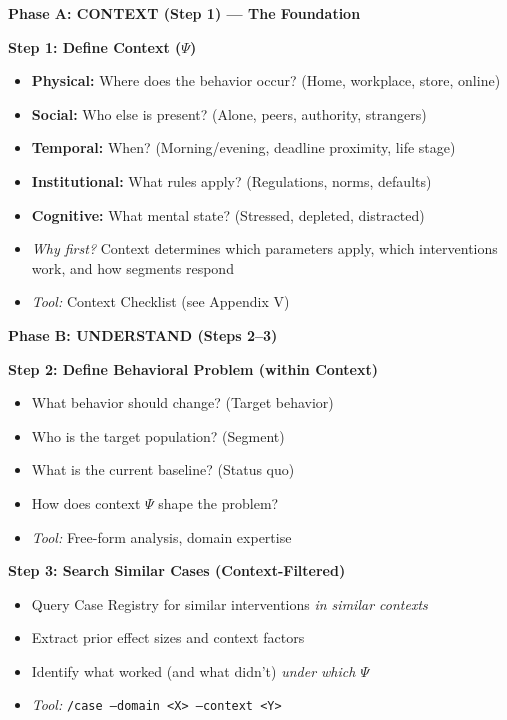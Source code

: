 \begin{tcolorbox}[colback=blue!5!white,colframe=blue!75!black,
    title=\textbf{7-Step Workflow: Context $\to$ Model $\to$ Portfolio $\to$ Learn}]

\textbf{Phase A: CONTEXT (Step 1) --- The Foundation}

\textbf{Step 1: Define Context ($\Psi$)}
\begin{itemize}[noitemsep]
    \item \textbf{Physical:} Where does the behavior occur? (Home, workplace, store, online)
    \item \textbf{Social:} Who else is present? (Alone, peers, authority, strangers)
    \item \textbf{Temporal:} When? (Morning/evening, deadline proximity, life stage)
    \item \textbf{Institutional:} What rules apply? (Regulations, norms, defaults)
    \item \textbf{Cognitive:} What mental state? (Stressed, depleted, distracted)
    \item \textit{Why first?} Context determines which parameters apply, which interventions work, and how segments respond
    \item \textit{Tool:} Context Checklist (see Appendix V)
\end{itemize}

\vspace{1em}
\textbf{Phase B: UNDERSTAND (Steps 2--3)}

\textbf{Step 2: Define Behavioral Problem (within Context)}
\begin{itemize}[noitemsep]
    \item What behavior should change? (Target behavior)
    \item Who is the target population? (Segment)
    \item What is the current baseline? (Status quo)
    \item How does context $\Psi$ shape the problem?
    \item \textit{Tool:} Free-form analysis, domain expertise
\end{itemize}

\textbf{Step 3: Search Similar Cases (Context-Filtered)}
\begin{itemize}[noitemsep]
    \item Query Case Registry for similar interventions \textit{in similar contexts}
    \item Extract prior effect sizes and context factors
    \item Identify what worked (and what didn't) \textit{under which $\Psi$}
    \item \textit{Tool:} \texttt{/case --domain <X> --context <Y>}
\end{itemize}


\end{tcolorbox}
